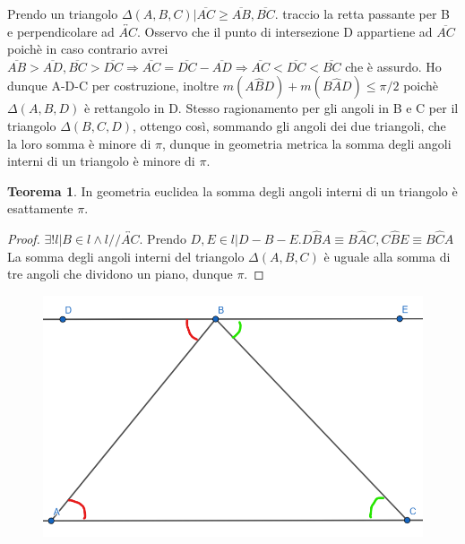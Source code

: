\documentclass[a4paper,10pt]{article}
\theoremstyle{definition}
\theoremstyle{indentdefinition}
\theoremstyle{indentpostulate}
\theoremstyle{indenttheorem}
\newtheorem{thm}{Teorema}[section]
\theoremstyle{myremark}
\theoremstyle{indentgeneral}
\begin{document}
Prendo un triangolo $\Delta (A,B,C)| \overline{AC} \geq \overline{AB},\overline{BC}$. traccio la retta passante per B e perpendicolare ad $\overleftrightarrow{AC}$. Osservo che il punto di intersezione D appartiene ad $\overline{AC}$ poichè in caso contrario avrei $\overline{AB}> \overline{AD}, \overline{BC}> \overline{DC} \Rightarrow \overline{AC}= \overline{DC}-\overline{AD} \Rightarrow \overline{AC} < \overline{DC} < \overline{BC}$ che  è assurdo.
Ho dunque A-D-C per costruzione, inoltre $m(A \hat{B}D)+m(B \hat{A}D) \leq \pi /2$ poichè $\Delta (A,B,D)$ è rettangolo in D. Stesso ragionamento per gli angoli in B e C per il triangolo $\Delta (B,C,D)$, ottengo così, sommando gli angoli dei due triangoli, che la loro somma è minore di $\pi$, dunque in geometria metrica la somma degli angoli interni di un triangolo è minore di $\pi$.

\begin{thm}  In geometria euclidea la somma degli angoli interni di un triangolo è esattamente $\pi$.    \end{thm} 

\begin{proof}  $\exists ! l|B \in l \land l//\overleftrightarrow{AC}$. Prendo $D,E \in l|D-B-E. D\hat{B}A \equiv B \hat{A}C, C \hat{B}E \equiv B \hat{C}A$\\
La somma degli angoli interni del triangolo $\Delta (A,B,C)$ è uguale alla somma di tre angoli che dividono un piano, dunque $ \pi$.\end{proof} 



\begin{figure}[H]
    \centering
    \includegraphics[scale=0.25]{Triangoli5.png}
\end{figure}
\end{document}
